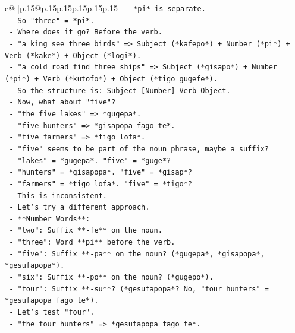 \documentclass{article}
\begin{document}
{\begin{supertabular}{c@{$\;$}|p{.15\linewidth}@{}p{.15\linewidth}p{.15\linewidth}p{.15\linewidth}p{.15\linewidth}p{.15\linewidth}}
{{{\texttt{          {-} *pi* is separate.} \\
\texttt{          {-} So "three" = *pi*.} \\
\texttt{          {-} Where does it go? Before the verb.} \\
\texttt{          {-} "a king see three birds" => Subject (*kafepo*) + Number (*pi*) + Verb (*kake*) + Object (*logi*).} \\
\texttt{          {-} "a cold road find three ships" => Subject (*gisapo*) + Number (*pi*) + Verb (*kutofo*) + Object (*tigo gugefe*).} \\
\texttt{          {-} So the structure is: Subject {[}Number{]} Verb Object.} \\
\texttt{          {-} Now, what about "five"?} \\
\texttt{          {-} "the five lakes" => *gugepa*.} \\
\texttt{          {-} "five hunters" => *gisapopa fago te*.} \\
\texttt{          {-} "five farmers" => *tigo lofa*.} \\
\texttt{          {-} "five" seems to be part of the noun phrase, maybe a suffix?} \\
\texttt{          {-} "lakes" = *gugepa*. "five" = *guge*?} \\
\texttt{          {-} "hunters" = *gisapopa*. "five" = *gisap*?} \\
\texttt{          {-} "farmers" = *tigo lofa*. "five" = *tigo*?} \\
\texttt{          {-} This is inconsistent.} \\
\texttt{          {-} Let's try a different approach.} \\
\texttt{          {-} **Number Words**:} \\
\texttt{            {-} "two": Suffix **{-}fe** on the noun.} \\
\texttt{            {-} "three": Word **pi** before the verb.} \\
\texttt{            {-} "five": Suffix **{-}pa** on the noun? (*gugepa*, *gisapopa*, *gesufapopa*).} \\
\texttt{            {-} "six": Suffix **{-}po** on the noun? (*gugepo*).} \\
\texttt{            {-} "four": Suffix **{-}su**? (*gesufapopa*? No, "four hunters" = *gesufapopa fago te*).} \\
\texttt{          {-} Let's test "four".} \\
\texttt{          {-} "the four hunters" => *gesufapopa fago te*.} \\
}}}
\end{supertabular}}
\end{document}
